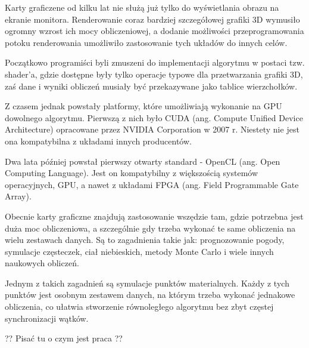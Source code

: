 


Karty graficzene od kilku lat nie służą już tylko do wyświetlania obrazu na ekranie monitora. Renderowanie coraz bardziej szczegółowej grafiki 3D wymusiło ogromny wzrost ich mocy obliczeniowej, a dodanie możliwości przeprogramowania potoku renderowania umożliwiło zastosowanie tych układów do innych celów.

Początkowo programiści byli zmuszeni do implementacji algorytmu w postaci tzw. shader'a, gdzie dostępne były tylko operacje typowe dla  przetwarzania grafiki 3D, zaś dane i wyniki obliczeń musiały być przekazywane jako tablice wierzchołków.

Z czasem jednak powstały platformy, które umożliwiają wykonanie na GPU dowolnego algorytmu. Pierwszą z nich było CUDA (ang. Compute Unified Device Architecture) opracowane przez NVIDIA Corporation w 2007 r. Niestety nie jest ona kompatybilna z układami innych producentów. 


Dwa lata później powstał pierwszy otwarty standard - OpenCL (ang. Open Computing Language). Jest on kompatybilny z większością systemów operacyjnych, GPU, a nawet z układami FPGA (ang. Field Programmable Gate Array). \linebreak


Obecnie karty graficzne znajdują zastosowanie wszędzie tam, gdzie potrzebna jest duża moc obliczeniowa, a szczególnie gdy trzeba wykonać te same obliczenia na wielu zestawach danych.
Są to zagadnienia takie jak: prognozowanie pogody, symulacje częsteczek, ciał niebieskich, metody Monte Carlo i wiele innych naukowych obliczeń. \linebreak %





Jednym z takich zagadnień są symulacje punktów materialnych. 
Każdy z tych punktów jest osobnym zestawem danych, na którym trzeba wykonać jednakowe obliczenia, co ułatwia stworzenie równoległego algorytmu bez zbyt częstej synchronizacji wątków.


?? Pisać tu o czym jest praca ??



